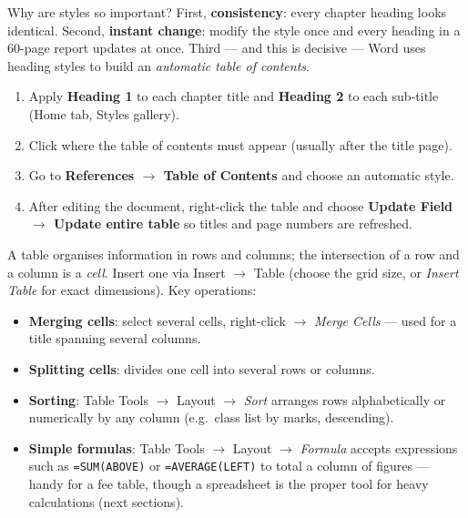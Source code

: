 \documentclass[11pt]{article}
\newcommand{\cle}[1]{{\popxbold\color{popdark}#1}}
\newcounter{popsec}
\newcounter{popsub}
\newcommand{\courssub}[1]{%
  \stepcounter{popsub}%
  \par\vspace{9pt}\noindent{\popxbold\fontsize{11.5}{13}\selectfont\color{popink}{\color{poporange}\thepopsec.\thepopsub}\hspace{6pt}#1}\par\nopagebreak\vspace{4pt}
}
\begin{document}
Why are styles so important? First, \textbf{consistency}: every chapter heading looks identical. Second, \textbf{instant change}: modify the style once and every heading in a 60-page report updates at once. Third — and this is decisive — Word uses heading styles to build an \emph{automatic table of contents}.

\begin{methode}
\begin{enumerate}
\item Apply \textbf{Heading 1} to each chapter title and \textbf{Heading 2} to each sub-title (Home tab, Styles gallery).
\item Click where the table of contents must appear (usually after the title page).
\item Go to \textbf{References $\rightarrow$ Table of Contents} and choose an automatic style.
\item After editing the document, right-click the table and choose \textbf{Update Field $\rightarrow$ Update entire table} so titles and page numbers are refreshed.
\end{enumerate}
\end{methode}

\courssub{Tables in Word}

A \cle{table} organises information in rows and columns; the intersection of a row and a column is a \emph{cell}. Insert one via Insert $\rightarrow$ Table (choose the grid size, or \emph{Insert Table} for exact dimensions). Key operations:

\begin{itemize}
\item \textbf{Merging cells}: select several cells, right-click $\rightarrow$ \emph{Merge Cells} — used for a title spanning several columns.
\item \textbf{Splitting cells}: divides one cell into several rows or columns.
\item \textbf{Sorting}: Table Tools $\rightarrow$ Layout $\rightarrow$ \emph{Sort} arranges rows alphabetically or numerically by any column (e.g.\ class list by marks, descending).
\item \textbf{Simple formulas}: Table Tools $\rightarrow$ Layout $\rightarrow$ \emph{Formula} accepts expressions such as \texttt{=SUM(ABOVE)} or \texttt{=AVERAGE(LEFT)} to total a column of figures — handy for a fee table, though a spreadsheet is the proper tool for heavy calculations (next sections).
\end{itemize}
\end{document}
